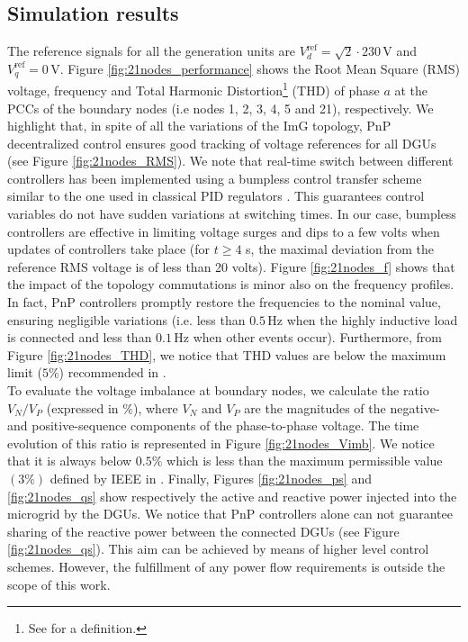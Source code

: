 \documentclass[a4paper]{article}
\theoremstyle{plain}
\begin{document}
\subsection{Simulation results}
    The reference signals for all the generation units are $V_d^{\mathrm{ref}} =
    \sqrt{2} \cdot 230\,\mbox{V}$ and $V_q^{\mathrm{ref}} = 0 \,\mbox{V}$. 
Figure \ref{fig:21nodes_performance} shows the Root Mean Square (RMS) voltage, frequency 
and Total Harmonic Distortion\footnote{See \cite{5154067} for a definition.} (THD) of phase $a$ at
the PCCs of the boundary nodes (i.e nodes 1, 2, 3, 4, 5 and 21), respectively. We highlight
that, in spite of all the variations of the ImG topology, PnP decentralized control ensures good tracking of
voltage references for all DGUs (see Figure
\ref{fig:21nodes_RMS}). We note that real-time switch between
different controllers has been implemented using a bumpless control
transfer scheme similar to the one used in classical PID
regulators \cite{aastrom2006advanced}. This guarantees control variables do not have sudden
variations at switching times. In our case, bumpless controllers are
effective in limiting voltage surges and dips to a
few volts when updates of controllers take place (for $t\geq 4$ s, the maximal deviation from the reference RMS voltage is of less than 20 volts). Figure \ref{fig:21nodes_f} shows
that the impact of the topology commutations is minor also on the frequency profiles. In fact, PnP controllers promptly restore the frequencies to the
nominal value, ensuring negligible variations (i.e. less than
$0.5\, \mathrm{Hz}$ when the highly inductive load is connected and less than $0.1\,\mathrm{Hz}$ when other events occur). Furthermore, from Figure \ref{fig:21nodes_THD}, we notice that THD values are
below the maximum limit ($5\%$) recommended in \cite{5154067}. \\
To evaluate the voltage imbalance at boundary nodes, we calculate the
ratio $V_N/V_P$ (expressed in $\%$), where $V_N$ and $V_P$ are the
magnitudes of the negative- and positive-sequence components of the
phase-to-phase voltage. The time evolution of this ratio is
represented in Figure \ref{fig:21nodes_Vimb}. We notice that it is
always below $0.5\%$ which is less than the maximum permissible value
$(3\%)$ defined by IEEE in \cite{5154067}. Finally, Figures \ref{fig:21nodes_ps} and \ref{fig:21nodes_qs} show respectively the active and
reactive power injected into the microgrid by the DGUs. We notice that
PnP controllers alone can not guarantee sharing of the reactive power
between the connected DGUs (see Figure \ref{fig:21nodes_qs}). This aim
can be achieved by means of higher level control schemes. However,
the fulfillment of any power flow requirements is outside the scope of
this work.
\end{document}
